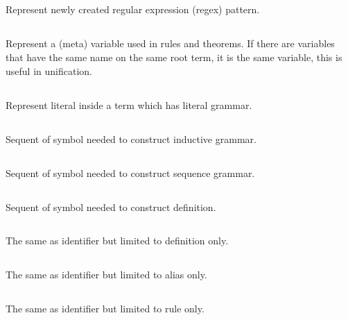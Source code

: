 \subsection{} Represent newly created regular expression (regex) pattern.

\subsection{} Represent a (meta) variable used in rules and theorems. If there are variables that have the same name on the same root term, it is the same variable, this is useful in unification.

\subsection{} Represent literal inside a term which has literal grammar.

\subsection{} Sequent of symbol needed to construct inductive grammar.

\subsection{} Sequent of symbol needed to construct sequence grammar.

\subsection{} Sequent of symbol needed to construct definition.

\subsection{} The same as identifier but limited to definition only.

\subsection{} The same as identifier but limited to alias only.

\subsection{} The same as identifier but limited to rule only.

